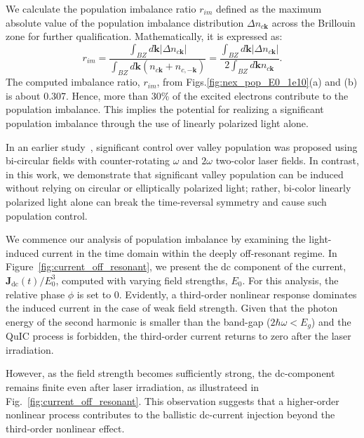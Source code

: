 We calculate the population imbalance ratio $r_{im}$ defined as the maximum absolute value of the
population imbalance distribution $\Delta n_{c\mathbf{k}}$ across the Brillouin zone for further
qualification. Mathematically, it is expressed as:
\begin{equation}
r_{im} = \frac{\int_{BZ}d\mathbf k \left |\Delta n_{c\mathbf{k}} \right |}{\int_{BZ}d\mathbf k \left (n_{c\mathbf{k}} + n_{c,-\mathbf{k}}\right )}
= \frac{\int_{BZ}d\mathbf k \left |\Delta n_{c\mathbf{k}} \right |}{2\int_{BZ}d\mathbf k n_{c\mathbf{k}}}.
\end{equation}
The computed imbalance ratio, $r_{im}$, from Figs.\ref{fig:nex_pop_E0_1e10}(a) and (b) is about
0.307. Hence, more than 30\% of the excited electrons contribute to the population imbalance.
This implies the potential for realizing a significant population imbalance through the use of linearly polarized light alone.

In an earlier study~\cite{Jimenez-Galan2020}, significant control over valley population was proposed using bi-circular fields with counter-rotating $\omega$ and $2\omega$ two-color laser fields. In contrast, in this work, we demonstrate that significant valley population can be induced without relying on circular or elliptically polarized light; rather, bi-color linearly polarized light alone can break the time-reversal symmetry and cause such population control.


We commence our analysis of population imbalance by examining the light-induced current in the time domain within the deeply off-resonant regime. In Figure~\ref{fig:current_off_resonant}, we present the dc component of the current, $\mathbf{J}_{\text{dc}}(t)/E_0^3$, computed with varying field strengths, $E_0$. For this analysis, the relative phase $\phi$ is set to 0. Evidently, a third-order nonlinear response dominates the induced current in the case of weak field strength. Given that the photon energy of the second harmonic is smaller than the band-gap ($2\hbar \omega < E_g$) and the \gls{QuIC} process is forbidden, the third-order current returns to zero after the laser irradiation.

However, as the field strength becomes sufficiently strong, the dc-component remains finite even after laser irradiation, as illustrateed in Fig.~\ref{fig:current_off_resonant}. This observation suggests that a higher-order nonlinear process contributes to the ballistic dc-current injection beyond the third-order nonlinear effect.

